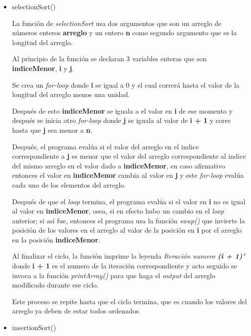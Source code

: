 \documentclass{article}
\begin{document}
			\begin{itemize}
				\item selectionSort()
				
				La función de \emph{selectionSort} usa dos argumentos que son un arreglo de números enteros \textbf{arreglo} y un entero \textbf{n} como segundo argumento que es la longitud del arreglo.
				
				Al principio de la función se declaran 3 variables enteras que son \textbf{indiceMenor}, \textbf{i} y \textbf{j}.
				
				Se crea un \emph{for-loop} donde \textbf{i} se igual a 0 y el cual correrá hasta el valor de la longitud del arreglo menos una unidad.
				
				Después de esto \textbf{indiceMenor} se iguala a el valor en \textbf{i} de ese momento y después se inicia otro \emph{for-loop} donde \textbf{j} se iguala al valor de \textbf{i + 1} y corre hasta que \textbf{j} sea menor a \textbf{n}.
				
				Después, el programa evalúa si el valor del arreglo en el indice correspondiente a \textbf{j} es menor que el valor del arreglo correspondiente al indice del mismo arreglo en el valor dado a \textbf{indiceMenor}, en caso afirmativo entonces el valor en \textbf{indiceMenor} cambia al valor en \textbf{j} y este \emph{for-loop} evalúa cada uno de los elementos del arreglo.
				
				Después de que el \emph{loop} termina, el programa evalúa si el valor en \textbf{i} no es igual al valor en \textbf{indiceMenor}, osea, si en efecto hubo un cambio en el \emph{loop} anterior; si así fue, entonces el programa usa la función \emph{swap()} que invierte la posición de los valores en el arreglo al valor de la posición en \textbf{i} por el arreglo en la posición \textbf{indiceMenor}.
				
				Al finalizar el ciclo, la función imprime la leyenda \emph{Iteración numero \textbf{(i + 1)}"} donde \textbf{i + 1} es el numero de la iteración correspondiente y acto seguido se invoca a la función \emph{printArray()} para que haga el \emph{output} del arreglo modificado durante ese ciclo.
				
				Este proceso se repite hasta que el ciclo termina, que es cuando los valores del arreglo ya deben de estar todos ordenados.
				
				
				\item insertionSort()
				

\end{itemize}
\end{document}
